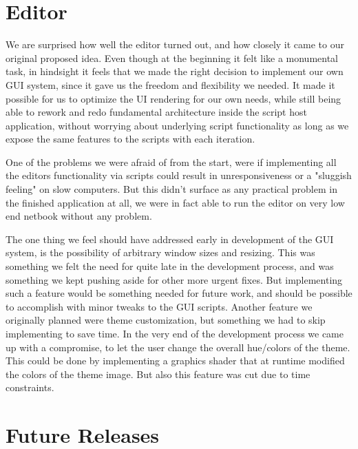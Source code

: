 \section{Editor}
We are surprised how well the editor turned out, and how closely it came to our original proposed idea. Even though at the beginning it felt like a monumental task, in hindsight it feels that we made the right decision to implement our own GUI system, since it gave us the freedom and flexibility we needed. It made it possible for us to optimize the UI rendering for our own needs, while still being able to rework and redo fundamental architecture inside the script host application, without worrying about underlying script functionality as long as we expose the same features to the scripts with each iteration.

One of the problems we were afraid of from the start, were if implementing all the editors functionality via scripts could result in unresponsiveness or a "sluggish feeling" on slow computers. But this didn't surface as any practical problem in the finished application at all, we were in fact able to run the editor on very low end netbook without any problem.

The one thing we feel should have addressed early in development of the GUI system, is the possibility of arbitrary window sizes and resizing. This was something we felt the need for quite late in the development process, and was something we kept pushing aside for other more urgent fixes. But implementing such a feature would be something needed for future work, and should be possible to accomplish with minor tweaks to the GUI scripts. Another feature we originally planned were theme customization, but something we had to skip implementing to save time. In the very end of the development process we came up with a compromise, to let the user change the overall hue/colors of the theme. This could be done by implementing a graphics shader that at runtime modified the colors of the theme image. But also this feature was cut due to time constraints. 



\section{Future Releases}

